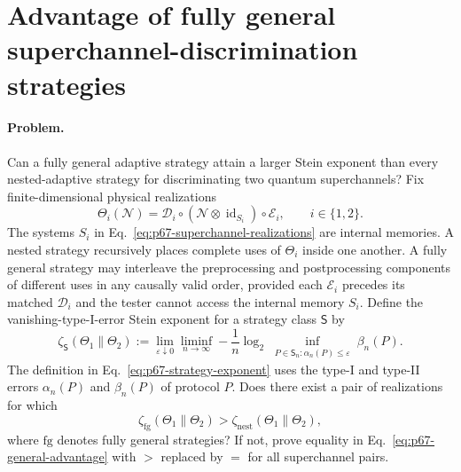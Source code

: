 \section{Advantage of fully general superchannel-discrimination strategies}
\label{sec:op_02bb8f8228649ac3}

\paragraph{Problem.}
Can a fully general adaptive strategy attain a larger Stein exponent than
every nested-adaptive strategy for discriminating two quantum superchannels?
Fix finite-dimensional physical realizations
\begin{equation}
  \Theta_i(\mathcal N)
  =\mathcal D_i\circ(\mathcal N\otimes\operatorname{id}_{S_i})
     \circ\mathcal E_i,
  \qquad i\in\{1,2\}.
  \label{eq:p67-superchannel-realizations}
\end{equation}
The systems $S_i$ in Eq.~\eqref{eq:p67-superchannel-realizations} are internal
memories.  A nested strategy recursively places complete uses of $\Theta_i$ inside one
another.  A fully general strategy may interleave the preprocessing and
postprocessing components of different uses in any causally valid order,
provided each $\mathcal E_i$ precedes its matched $\mathcal D_i$ and the
tester cannot access the internal memory $S_i$.  Define the vanishing-type-I-error Stein
exponent for a strategy class $\mathsf S$ by
\begin{equation}
  \zeta_{\mathsf S}(\Theta_1\|\Theta_2)
  :=\lim_{\varepsilon\downarrow0}\liminf_{n\to\infty}
    -\frac1n\log_2
    \inf_{\substack{P\in\mathsf S_n:\alpha_n(P)\leq\varepsilon}}
    \beta_n(P).
  \label{eq:p67-strategy-exponent}
\end{equation}
The definition in Eq.~\eqref{eq:p67-strategy-exponent} uses the type-I and
type-II errors $\alpha_n(P)$ and $\beta_n(P)$ of protocol $P$.
Does there exist a pair of realizations for which
\begin{equation}
  \zeta_{\mathrm{fg}}(\Theta_1\|\Theta_2)
  >\zeta_{\mathrm{nest}}(\Theta_1\|\Theta_2),
  \label{eq:p67-general-advantage}
\end{equation}
where $\mathrm{fg}$ denotes fully general strategies?  If not, prove equality
in Eq.~\eqref{eq:p67-general-advantage} with $>$ replaced by $=$ for all
superchannel pairs.

